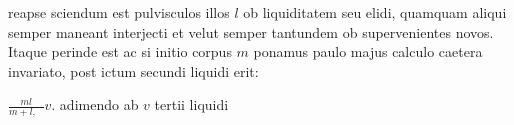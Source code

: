 %
%
reapse sciendum est pulvisculos illos $\displaystyle l$ ob liquiditatem seu 
elidi, quamquam aliqui semper maneant interjecti et velut semper tantundem ob supervenientes novos.
Itaque perinde est ac si initio corpus $\displaystyle m$ ponamus paulo majus calculo caetera invariato, 
post ictum secundi liquidi erit: \rule[-4mm]{0mm}{10mm}$\displaystyle \frac{ml}{m + l, \, \boxed{\phantom{\scriptstyle{2}}}} v$. adimendo ab $\displaystyle v$ 
tertii liquidi%